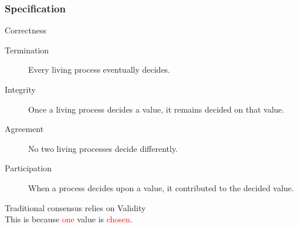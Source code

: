 \begin{frame}
  \frametitle{Specification}

  \begin{beamerboxesrounded}{Correctness}
    \begin{description}
    \item[Termination] Every living process eventually decides.
    \item[Integrity] Once a living process decides a value, it remains decided on that value.
    \item[Agreement] No two living processes decide differently.
    \item[Participation] When a process decides upon a value, it
      contributed to the decided value.
    \end{description}
  \end{beamerboxesrounded}

\bigskip

  Traditional consensus relies on \textcolor{green!75!black}{Validity}\\
  This is because \textcolor{red}{one} value is \textcolor{red}{chosen}.

\end{frame}

